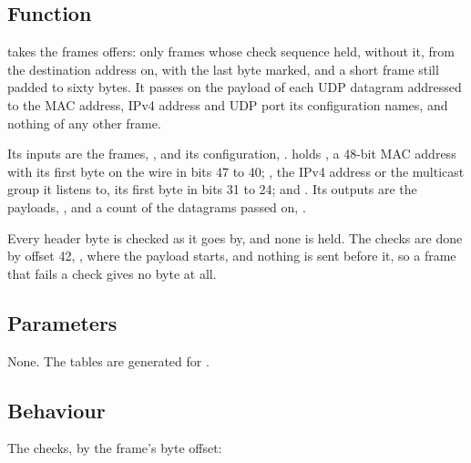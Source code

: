 
%
{}

\subsection*{Function}

 takes the frames  offers: only frames whose
check sequence held, without it, from the destination address on,
with the last byte marked, and a short frame still padded to sixty
bytes. It passes on the payload of each UDP datagram addressed to the
MAC address, IPv4 address and UDP port its configuration names, and
nothing of any other frame.

Its inputs are the frames, , and its configuration,
.  holds , a 48-bit MAC
address with its first byte on the wire in bits 47 to 40; ,
the IPv4 address or the multicast group it listens to, its first byte
in bits 31 to 24; and . Its outputs are the payloads,
, and a count of the datagrams passed on,
.

Every header byte is checked as it goes by, and none is held. The
checks are done by offset 42, , where the payload
starts, and nothing is sent before it, so a frame that fails
a check gives no byte at all.

\subsection*{Parameters}

None. The tables are generated for .


\subsection*{Behaviour}

The checks, by the frame's byte offset:

